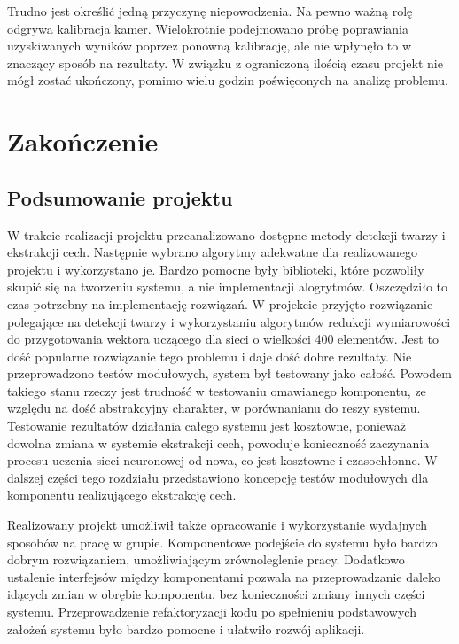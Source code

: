 \documentclass[oneside, eng]{mgr}
\begin{document}
Trudno jest określić jedną przyczynę niepowodzenia. Na pewno ważną rolę odgrywa kalibracja kamer. Wielokrotnie podejmowano próbę poprawiania uzyskiwanych wyników poprzez ponowną kalibrację, ale nie wpłynęło to w znaczący sposób na rezultaty. W związku z ograniczoną ilością czasu projekt nie mógł zostać ukończony, pomimo wielu godzin poświęconych na analizę problemu.



\chapter{Zakończenie}

\section{Podsumowanie projektu}

W trakcie realizacji projektu przeanalizowano dostępne metody detekcji twarzy i ekstrakcji cech. Następnie wybrano algorytmy adekwatne dla realizowanego projektu i wykorzystano je. Bardzo pomocne były biblioteki, które pozwoliły skupić się na tworzeniu systemu, a nie implementacji alogrytmów. Oszczędziło to czas potrzebny na implementację rozwiązań. W projekcie przyjęto rozwiązanie polegające na detekcji twarzy i wykorzystaniu algorytmów redukcji wymiarowości do przygotowania wektora uczącego dla sieci o wielkości 400 elementów. Jest to dość popularne rozwiązanie tego problemu i daje dość dobre rezultaty. Nie przeprowadzono testów modułowych, system był testowany jako całość. Powodem takiego stanu rzeczy jest trudność w testowaniu omawianego komponentu, ze względu na dość abstrakcyjny charakter, w porównanianu do reszy systemu. Testowanie rezultatów działania całego systemu jest kosztowne, ponieważ dowolna zmiana w systemie ekstrakcji cech, powoduje konieczność zaczynania procesu uczenia sieci neuronowej od nowa, co jest kosztowne i czasochłonne. W dalszej części tego rozdziału przedstawiono koncepcję testów modułowych dla komponentu realizującego ekstrakcję cech.

Realizowany projekt umożliwił także opracowanie i wykorzystanie wydajnych sposobów na pracę w grupie. Komponentowe podejście do systemu było bardzo dobrym rozwiązaniem, umożliwiającym zrównoleglenie pracy. Dodatkowo ustalenie interfejsów między komponentami pozwala na przeprowadzanie daleko idących zmian w obrębie komponentu, bez konieczności zmiany innych części systemu. Przeprowadzenie refaktoryzacji kodu po spełnieniu podstawowych założeń systemu było bardzo pomocne i ułatwiło rozwój aplikacji.
\end{document}
